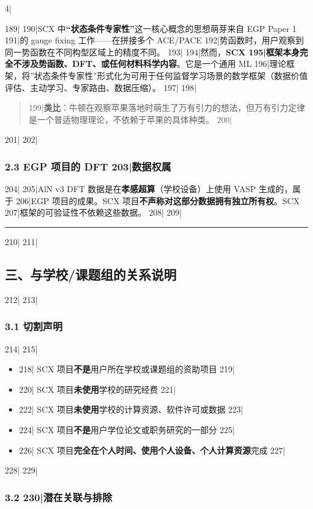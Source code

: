 4|\documentclass[
5|  12pt,
6|]{ctexart}
\begin{document}
189|
190|SCX 中\textbf{``状态条件专家性''}这一核心概念的思想萌芽来自 EGP Paper 1
191|的 gauge fixing 工作------在拼接多个 ACE/PACE
192|势函数时，用户观察到同一势函数在不同构型区域上的精度不同。
193|
194|然而，\textbf{SCX
195|框架本身完全不涉及势函数、DFT、或任何材料科学内容}。它是一个通用 ML
196|理论框架，将''状态条件专家性''形式化为可用于任何监督学习场景的数学框架（数据价值评估、主动学习、专家路由、数据压缩）。
197|
198|\begin{quote}
199|\textbf{类比}：牛顿在观察苹果落地时萌生了万有引力的想法，但万有引力定律是一个普适物理理论，不依赖于苹果的具体种类。
200|\end{quote}
201|
202|\subsubsection{2.3 EGP 项目的 DFT
203|数据权属}\label{egp-ux9879ux76eeux7684-dft-ux6570ux636eux6743ux5c5e}
204|
205|AlN v3 DFT 数据是在\textbf{孝感超算}（学校设备）上使用 VASP 生成的，属于
206|EGP 项目的成果。SCX 项目\textbf{不声称对这部分数据拥有独立所有权}。SCX
207|框架的可验证性不依赖这些数据。
208|
209|\begin{center}\rule{0.5\linewidth}{0.5pt}\end{center}
210|
211|\subsection{三、与学校/课题组的关系说明}\label{ux4e09ux4e0eux5b66ux6821ux8bfeux9898ux7ec4ux7684ux5173ux7cfbux8bf4ux660e}
212|
213|\subsubsection{3.1 切割声明}\label{ux5207ux5272ux58f0ux660e}
214|
215|\begin{itemize}
216||\item
218|  SCX 项目\textbf{不是}用户所在学校或课题组的资助项目
219|\item
220|  SCX 项目\textbf{未使用}学校的研究经费
221|\item
222|  SCX 项目\textbf{未使用}学校的计算资源、软件许可或数据
223|\item
224|  SCX 项目\textbf{不是}用户学位论文或职务研究的一部分
225|\item
226|  SCX 项目\textbf{完全在个人时间、使用个人设备、个人计算资源}完成
227|\end{itemize}
228|
229|\subsubsection{3.2
230|潜在关联与排除}\label{ux6f5cux5728ux5173ux8054ux4e0eux6392ux9664}
\end{document}
